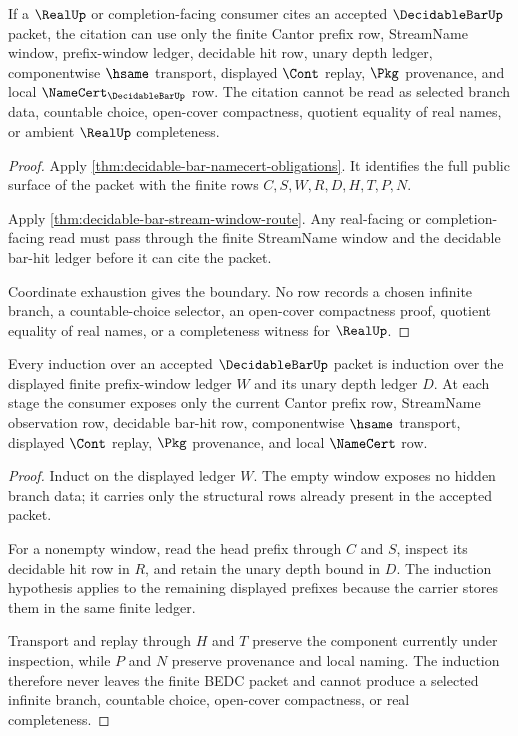 \begin{theorem}
\label{thm:decidable-bar-real-completion-boundary}
If a $\RealUp$ or completion-facing consumer cites an accepted
$\DecidableBarUp$ packet, the citation can use only the finite Cantor prefix
row, StreamName window, prefix-window ledger, decidable hit row, unary depth
ledger, componentwise $\hsame$ transport, displayed $\Cont$ replay, $\Pkg$
provenance, and local $\NameCert_{\DecidableBarUp}$ row. The citation cannot be
read as selected branch data, countable choice, open-cover compactness, quotient
equality of real names, or ambient $\RealUp$ completeness.
\end{theorem}
\begin{proof}
Apply \autoref{thm:decidable-bar-namecert-obligations}. It identifies the full
public surface of the packet with the finite rows $C,S,W,R,D,H,T,P,N$.

Apply \autoref{thm:decidable-bar-stream-window-route}. Any real-facing or
completion-facing read must pass through the finite StreamName window and the
decidable bar-hit ledger before it can cite the packet.

Coordinate exhaustion gives the boundary. No row records a chosen infinite
branch, a countable-choice selector, an open-cover compactness proof, quotient
equality of real names, or a completeness witness for $\RealUp$.
\end{proof}

\begin{theorem}
\label{thm:decidable-bar-finite-branch-induction}
Every induction over an accepted $\DecidableBarUp$ packet is induction over the
displayed finite prefix-window ledger $W$ and its unary depth ledger $D$. At each
stage the consumer exposes only the current Cantor prefix row, StreamName
observation row, decidable bar-hit row, componentwise $\hsame$ transport,
displayed $\Cont$ replay, $\Pkg$ provenance, and local $\NameCert$ row.
\end{theorem}
\begin{proof}
Induct on the displayed ledger $W$. The empty window exposes no hidden branch
data; it carries only the structural rows already present in the accepted
packet.

For a nonempty window, read the head prefix through $C$ and $S$, inspect its
decidable hit row in $R$, and retain the unary depth bound in $D$. The induction
hypothesis applies to the remaining displayed prefixes because the carrier
stores them in the same finite ledger.

Transport and replay through $H$ and $T$ preserve the component currently under
inspection, while $P$ and $N$ preserve provenance and local naming. The induction
therefore never leaves the finite BEDC packet and cannot produce a selected
infinite branch, countable choice, open-cover compactness, or real completeness.
\end{proof}

